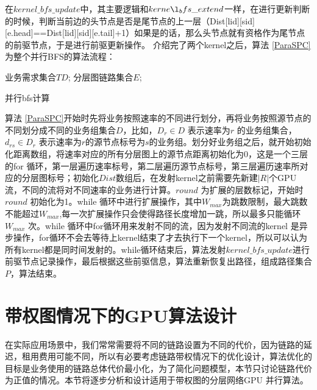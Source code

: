 在$kernel\_bfs\_update$中，其主要逻辑和$kerne\l_bfs\_extend$一样，在进行更新判断的时候，判断当前边的头节点是否是尾节点的上一层（Dist[lid][sid][e.head]==Dist[lid][sid][e.tail]+1）如果是的话，那么头节点就有资格作为尾节点的前驱节点，于是进行前驱更新操作。
介绍完了两个kernel之后，算法 \ref{ParaSPC}为整个并行BFS的算法流程：
\begin{algorithm}[t]
\begin{algorithmic}[1]
\Require
业务需求集合$TD$;
分层图链路集合$E$;
\Else
{}
\EndIf
{}
\EndFor
\EndFor
\EndFor
\EndFor
{}
\EndFor
{}
\EndWhile
{}
\EndFor
{}
\end{algorithmic}
\caption{{并行bfs计算}}
\label{ParaSPC}
\end{algorithm}
算法 \ref{ParaSPC}开始时先将业务按照速率的不同进行划分，再将业务按照源节点的不同划分成不同的业务组集合$D$，比如，$D_r \in D$ 表示速率为$r$ 的业务组集合，$d_{rs} \in D_r$ 表示速率为$r$的源节点标号为$s$的业务组。划分好业务组之后，就开始初始化距离数组，将速率对应的所有分层图上的源节点距离初始化为0，这是一个三层的for 循环，第一层遍历速率标号，第二层遍历源节点标号，第三层遍历速率所对应的分层图标号；初始化$Dist$数组后，在发射kernel之前需要先新建$|R|$个GPU 流，不同的流将对不同速率的业务进行计算。$round$ 为扩展的层数标记，开始时$round$ 初始化为1。while 循环中进行扩展操作，其中$W_{max}$为跳数限制，最大跳数不能超过$W_{max}$,每一次扩展操作只会使得路径长度增加一跳，所以最多只能循环$W_{max}$ 次。while 循环中for循环用来发射不同的流，因为发射不同流的kernel 是异步操作，for循环不会去等待上kernel结束了才去执行下一个kernel，所以可以认为所有kernel都是同时间发射的。while循环结束后，算法发射$kernel\_bfs\_update$进行前驱节点记录操作，最后根据这些前驱信息，算法重新恢复出路径，组成路径集合$P$，算法结束。
\section{带权图情况下的GPU算法设计}

在实际应用场景中，我们常常需要将不同的链路设置为不同的代价，因为链路的延迟，租用费用可能不同，所以有必要考虑链路带权情况下的优化设计，算法优化的目标是业务使用的链路总体代价最小化，为了简化问题模型，本节只讨论链路代价为正值的情况。本节将逐步分析和设计适用于带权图的分层网络GPU 并行算法。
